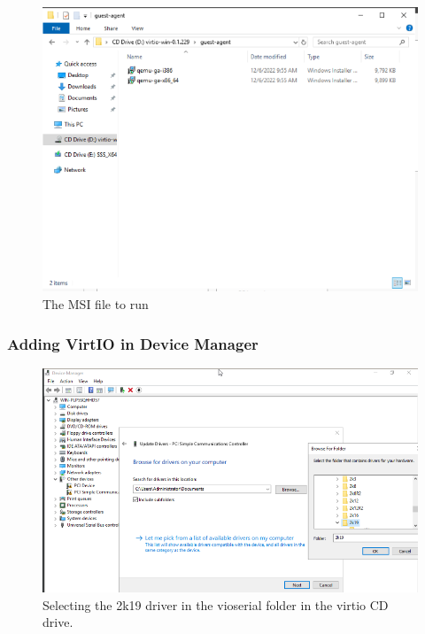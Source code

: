 \documentclass{article}
\begin{document}
\begin{figure}[H]
    \centering
    \includegraphics[width=1\textwidth]{runningGuestAgent.png}
    \caption{The MSI file to run}
    \label{fig:runningGuestAgent}
\end{figure}

\subsubsection{Adding VirtIO in Device Manager}

\begin{figure}[H]
    \centering
    \includegraphics[width=1\textwidth]{Adding-VIRTIO-Driver.png}
    \caption{Selecting the 2k19 driver in the vioserial folder in the virtio CD drive.}
    \label{fig:Adding-VIRTIO-Driver}
\end{figure}
\end{document}
